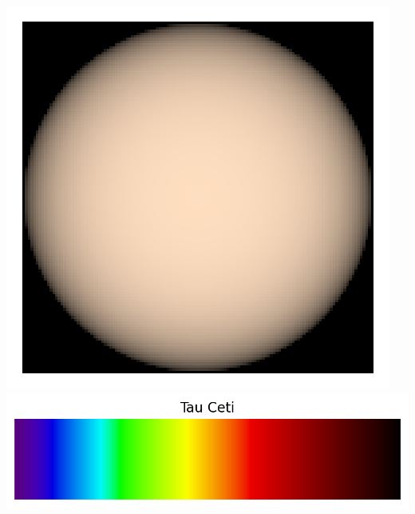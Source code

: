 \documentclass[12pt,a4paper,fleqn]{article}
\begin{document}
\begin{center}
\newcommand{\localheight}{75 pt}
\includegraphics[height=\localheight]{images/star_tau_ceti.png}
\includegraphics[height=\localheight]{images/spectrum_star_tau_ceti.png}


\end{center}
\end{document}
